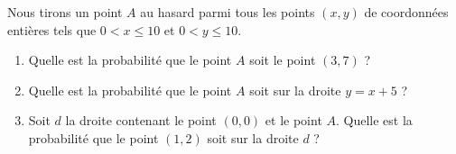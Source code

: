 
\begin{exercice}\label{exosmath-0279}

    Nous tirons un point \( A\) au hasard parmi tous les points \( (x,y)\) de coordonnées entières tels que \( 0< x\leq 10\) et \( 0< y\leq 10\).
    \begin{enumerate}
        \item
            Quelle est la probabilité que le point \( A\) soit le point \( (3,7)\) ?
        \item
            Quelle est la probabilité que le point \( A\) soit sur la droite \( y=x+5\) ?
        \item
            Soit \( d\) la droite contenant le point \( (0,0)\) et le point \( A\). Quelle est la probabilité que le point \( (1,2)\) soit sur la droite \( d\) ?
    \end{enumerate}

\end{exercice}
